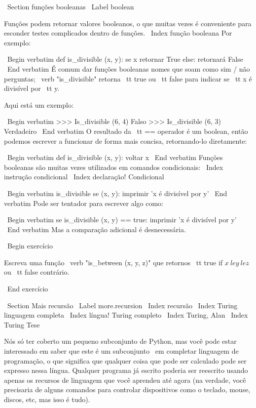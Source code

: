 \documentclass[10pt]{book}
\begin{document}
{{{{\ Section {} funções booleanas
\ Label {boolean}

Funções podem retornar valores booleanos, o que muitas vezes é conveniente para esconder
testes complicados dentro de funções. \ Index {função booleana}
Por exemplo:

\ Begin {verbatim}
def is_divisible (x, y):
    se x%
        retornar True
    else:
        retornará False
\ End {verbatim}
%
É comum dar funções booleanas nomes que soam como sim / não
perguntas; \ verb "is_divisible" retorna {\ tt true} ou {\ tt false}
para indicar se {\ tt x} é divisível por {\ tt y}.

Aqui está um exemplo:

\ Begin {verbatim}
>>> Is_divisible (6, 4)
Falso
>>> Is_divisible (6, 3)
Verdadeiro
\ End {verbatim}
%
O resultado da {\ tt ==} operador é um boolean, então podemos escrever a
funcionar de forma mais concisa, retornando-lo diretamente:

\ Begin {verbatim}
def is_divisible (x, y):
    voltar x%
\ End {verbatim}
%
Funções booleanas são muitas vezes utilizados em comandos condicionais:
\ Index {instrução condicional}
\ Index {declaração! Condicional}

\ Begin {verbatim}
is_divisible se (x, y):
    imprimir 'x é divisível por y'
\ End {verbatim}
%
Pode ser tentador para escrever algo como:

\ Begin {verbatim}
se is_divisible (x, y) == true:
    imprimir 'x é divisível por y'
\ End {verbatim}
%
Mas a comparação adicional é desnecessária.

\ Begin {} exercício

Escreva uma função \ verb "is_between (x, y, z)" que
retornos {\ tt true} if $ x \ le y \ le z $ ou {\ tt false} contrário.

\ End {} exercício


\ Section {Mais recursão}
\ Label {} more.recursion
\ Index {recursão}
\ Index {Turing linguagem completa}
\ Index {língua! Turing completo}
\ Index {Turing, Alan}
\ Index {Turing Tese}

Nós só ter coberto um pequeno subconjunto de Python, mas você pode
estar interessado em saber que este é um subconjunto {\ em completar}
linguagem de programação, o que significa que qualquer coisa que pode ser
calculado pode ser expresso nessa língua. Qualquer programa já escrito
poderia ser reescrito usando apenas os recursos de linguagem que você aprendeu
até agora (na verdade, você precisaria de alguns comandos para controlar dispositivos
como o teclado, mouse, discos, etc, mas isso é tudo).

}}}}
\end{document}
